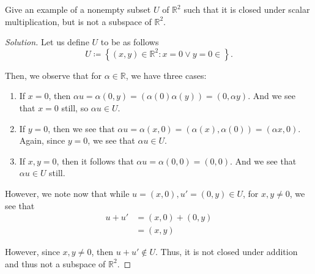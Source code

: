 \documentclass[openany]{book}
\newenvironment{solution}{\begin{proof}[Solution]}{\end{proof}}
\newcommand{\RR}{\mathbb{R}}
\begin{document}
	\begin{hw}
		Give an example of a nonempty subset $U$ of $\RR^{2}$ such that it is closed under scalar multiplication, but is not a subspace of $\RR^{2}$.
	\end{hw}
	\begin{solution}
		Let us define $U$ to be as follows
		\begin{equation*}
			U \coloneq \left\{  (x,y) \in \RR^{2} : x = 0 \lor y = 0 \in \right\}.
		\end{equation*}
	
		Then, we observe that for $\alpha \in \RR$, we have three cases:
		\begin{enumerate}
			\item If $x = 0$, then $\alpha u = \alpha (0, y) = (\alpha(0) \alpha (y)) = (0, \alpha y)$. And we see that $x = 0$ still, so $\alpha u \in U$.
			\item If $y = 0$, then we see that $\alpha u = \alpha(x,0) = (\alpha (x), \alpha (0)) = (\alpha x, 0)$. Again, since $y = 0$, we see that $\alpha u \in U$.
			\item If $x,y = 0$, then it follows that $\alpha u = \alpha(0,0) = (0,0)$. And we see that $\alpha u \in U$ still.
		\end{enumerate}
	
		However, we note now that while $u = (x,0), u'= (0,y) \in U$, for $x,y \neq 0$, we see that
		\begin{align*}
			u + u' &= (x,0) + (0,y) \\
			&= (x,y)
		\end{align*}
	
		However, since $x,y \neq 0$, then $u + u' \not\in U$. Thus, it is not closed under addition and thus not a subspace of $\RR^{2}$.
	\end{solution}
\end{document}
